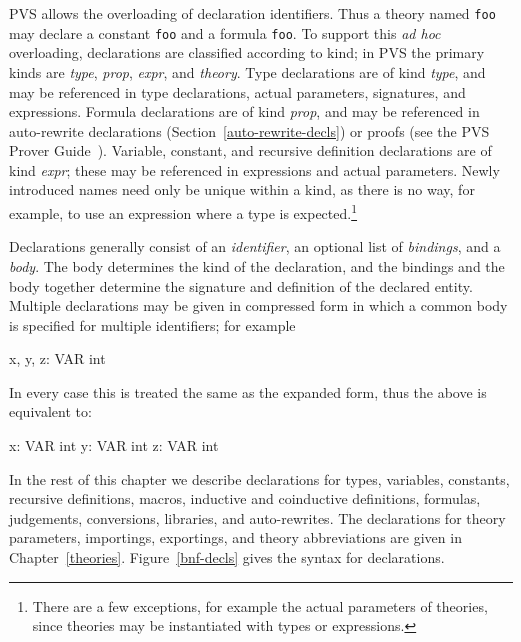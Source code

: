 PVS allows the overloading of declaration identifiers.
Thus a theory named \texttt{foo} may declare a constant \texttt{foo} and a
formula \texttt{foo}.  To support this \emph{ad hoc} overloading,
declarations are classified according to kind; in
PVS the primary kinds are \emph{type},
\emph{prop},
\emph{expr}, and
\emph{theory}.  Type declarations are of
kind \emph{type}, and may be referenced in type declarations, actual
parameters, signatures, and expressions.  Formula declarations are of kind
\emph{prop}, and may be referenced in auto-rewrite declarations
(Section~\ref{auto-rewrite-decls}) or proofs (see the PVS Prover
Guide~\cite{PVS:prover}).  Variable, constant, and recursive definition
declarations are of kind \emph{expr}; these may be referenced in
expressions and actual parameters.  Newly introduced names need only be
unique within a kind, as there is no way, for example, to use an
expression where a type is expected.\footnote{There are a few exceptions,
for example the actual parameters of theories, since theories may be
instantiated with types or expressions.}


Declarations generally consist of an
\emph{identifier}, an optional list of
\emph{bindings}, and a
\emph{body}.  The body determines the kind of the
declaration, and the bindings and the body together determine the
signature and definition of the declared entity.  Multiple
declarations may be given in compressed form
in which a common body is specified for multiple identifiers; for example
%
\begin{pvsex}
  x, y, z: VAR int
\end{pvsex}
In every case this is treated the same as the expanded form, thus the
above is equivalent to:
\begin{pvsex}
  x: VAR int
  y: VAR int
  z: VAR int
\end{pvsex}

In the rest of this chapter we describe declarations for types, variables,
constants, recursive definitions, macros, inductive and coinductive
definitions, formulas, judgements, conversions, libraries, and
auto-rewrites.  The declarations for theory parameters, importings,
exportings, and theory abbreviations are given in Chapter~\ref{theories}.
Figure~\ref{bnf-decls} gives the syntax for declarations.

